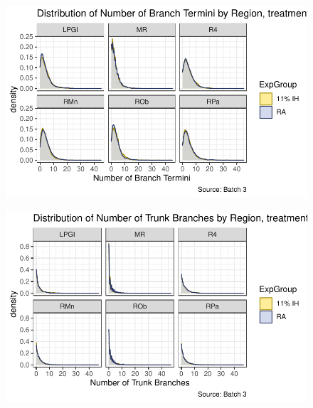 \documentclass[
  12pt,
  letterpaper,
  DIV=11,
  numbers=noendperiod]{scrartcl}
\begin{document}
\begin{figure}[H]

{\centering \includegraphics{Fiber_analysis_quarto_files/figure-pdf/make_distribution_plots_region-1.pdf}

}

\end{figure}

\begin{figure}[H]

{\centering \includegraphics{Fiber_analysis_quarto_files/figure-pdf/make_distribution_plots_region-2.pdf}

}

\end{figure}
\end{document}
